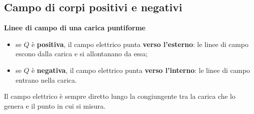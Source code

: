 \subsection{Campo di corpi positivi e negativi}


\begin{concetto}
\textbf{Linee di campo di una carica puntiforme}
\begin{itemize}[leftmargin=1cm]
  \item se \(Q\) è \textbf{positiva}, il campo elettrico punta \textbf{verso l'esterno}: le linee di campo escono dalla carica e si allontanano da essa;
  \item se \(Q\) è \textbf{negativa}, il campo elettrico punta \textbf{verso l'interno}: le linee di campo entrano nella carica.
\end{itemize}
Il campo elettrico è sempre diretto lungo la congiungente tra la carica che lo genera e il punto in cui si misura.
\end{concetto}

\begin{figure}[htbp]
\centering
{}
\end{figure}



